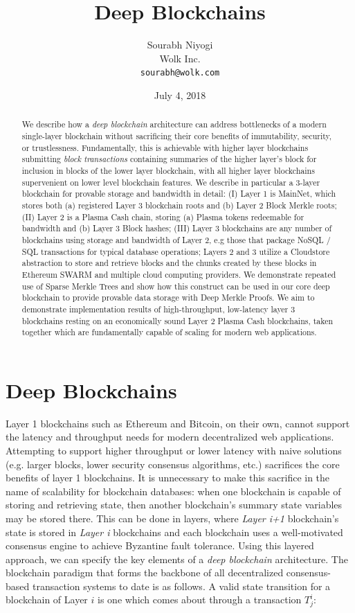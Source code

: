\documentclass{article}
\title{Deep Blockchains}
\author{Sourabh Niyogi\\Wolk Inc.\\{\tt sourabh@wolk.com}}
\date{July 4, 2018}
\newcommand{\transaction}[2]{T_{#2}^#1}
\begin{document}
\maketitle

\begin{abstract}
We describe how a {\em deep blockchain} architecture can address bottlenecks of a modern single-layer blockchain without sacrificing their core benefits of immutability, security, or trustlessness.  Fundamentally, this is achievable with higher layer blockchains submitting {\em block transactions} containing summaries of the higher layer's block for inclusion in blocks of the lower layer blockchain, with all higher layer blockchains supervenient on lower level blockchain features.   We describe in particular a 3-layer blockchain for provable storage and bandwidth in detail: (I) Layer 1 is MainNet, which stores both (a) registered Layer 3 blockchain roots and (b) Layer 2 Block Merkle roots; (II) Layer 2 is a Plasma Cash chain, storing (a) Plasma tokens redeemable for bandwidth and (b) Layer 3 Block hashes; (III) Layer 3 blockchains are any number of blockchains using storage and bandwidth of Layer 2, e.g those that package NoSQL / SQL transactions for typical database operations;  Layers 2 and 3 utilize a Cloudstore abstraction to store and retrieve blocks and the chunks created by these blocks in Ethereum SWARM and multiple cloud computing providers.  We demonstrate repeated use of Sparse Merkle Trees and show how this construct can be used in our core deep blockchain to provide provable data storage with Deep Merkle Proofs.  We aim to demonstrate implementation results of high-throughput, low-latency layer 3 blockchains resting on an economically sound Layer 2 Plasma Cash blockchains, taken together which are fundamentally capable of scaling for modern web applications.
\end{abstract}

\section{Deep Blockchains}

Layer 1 blockchains such as Ethereum and Bitcoin, on their own, cannot support the latency and throughput needs for modern decentralized web applications.  Attempting to support higher throughput or lower latency with naive solutions (e.g. larger blocks, lower security consensus algorithms, etc.) sacrifices the core benefits of layer 1 blockchains.   It is unnecessary to make this sacrifice in the name of scalability for blockchain databases:  when one blockchain is capable of storing and retrieving state, then another blockchain's summary state variables may be stored there.  This can be done in layers, where {\em Layer i+1} blockchain's state is stored in {\em Layer i} blockchains and each blockchain uses a well-motivated consensus engine to achieve Byzantine fault tolerance.
Using this layered approach, we can specify the key elements of a {\em deep blockchain} architecture.  The blockchain paradigm \cite{wood2015} that forms the backbone of all decentralized consensus-based transaction systems to date is as follows. A valid state transition for a blockchain of Layer $i$ is one which comes about through a transaction $\transaction{i}{j}$:
\end{document}
